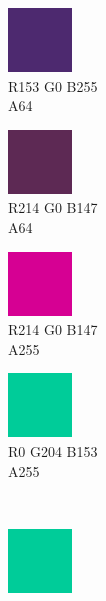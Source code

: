 \begin{figure}[h]
\begin{subfigure}{0.105\textwidth}
		\centering
		\includegraphics[scale=1, frame]{gui-imgs/R153G0B255A64}
		\vspace*{-20px} \caption*{\hspace*{-0.25px}\tiny R153 G0 B255 \\ \tiny A64}
	\end{subfigure}
	\begin{subfigure}{0.105\textwidth}
		\centering
		\includegraphics[scale=1, frame]{gui-imgs/R214G0B147A64}
		\vspace*{-20px}\caption*{\hspace*{-0.25px}\tiny R214 G0 B147 \\ \tiny A64}
	\end{subfigure}
	\begin{subfigure}{0.105\textwidth}
		\centering
		\includegraphics[scale=1, frame]{gui-imgs/R214G0B147A255}
		\vspace*{-20px} \caption*{\hspace*{-0.25px}\tiny R214 G0 B147 \\ \tiny A255}
	\end{subfigure}
	\begin{subfigure}{0.105\textwidth}
		\centering
		\includegraphics[scale=1, frame]{gui-imgs/R0G204B153A255}
		\vspace*{-20px} \caption*{\hspace*{-0.25px}\tiny R0 G204 B153 \\ \tiny A255}
	\end{subfigure} \\
	\begin{subfigure}{0.105\textwidth}
		\centering
		\includegraphics[scale=1, frame]{gui-imgs/R0G204B153A255}

\end{subfigure}
\end{figure}
